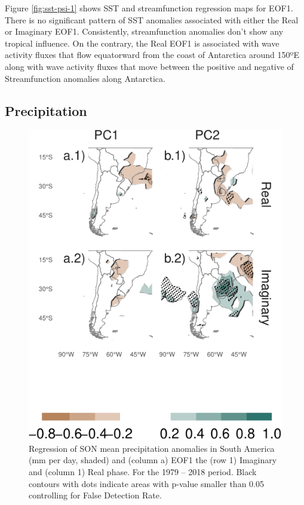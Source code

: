 \documentclass[smallextended]{svjour3}       %
\begin{document}
Figure \ref{fig:sst-psi-1} shows SST and streamfunction regression maps for EOF1. There is no significant pattern of SST anomalies associated with either the Real or Imaginary EOF1. Consistently, streamfunction anomalies don't show any tropical influence. On the contrary, the Real EOF1 is associated with wave activity fluxes that flow equatorward from the coast of Antarctica around 150ºE along with wave activity fluxes that move between the positive and negative of Streamfunction anomalies along Antarctica.

\hypertarget{precipitation}{%
\subsection{Precipitation}\label{precipitation}}



\begin{figure}
\centering
\includegraphics{../figures/pp-america-1.pdf}
\caption{\label{fig:pp-america}Regression of SON mean precipitation anomalies in South America (mm per day, shaded) and (column a) EOF1 the (row 1) Imaginary and (column 1) Real phase. For the 1979 -- 2018 period. Black contours with dots indicate areas with p-value smaller than 0.05 controlling for False Detection Rate.}
\end{figure}
\end{document}
